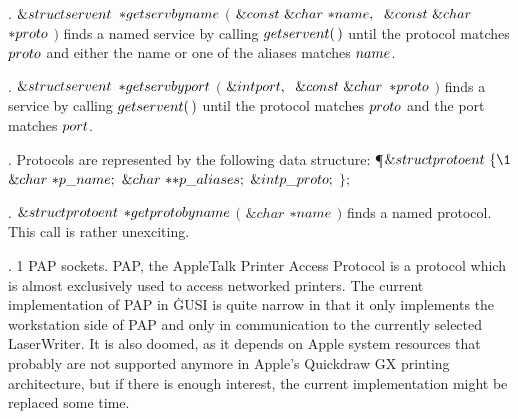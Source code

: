 \fi

. \CD{}$\&{struct}\ \\{servent}$ ${{*}}\\{getservbyname}$ $($ $\&{const}\ %
\&{char}\ {{*}}\\{name},\;\ \&{const}\ \&{char}$ ${{*}}\\{proto}$ $)$\DC{}
finds a named
service by calling \CD{}$\\{getservent}(\,)$\DC{} until the protocol matches %
\CD{}$\\{proto}$\DC{} and either the name or
one of the aliases matches \CD{}$\\{name}$\DC{}.

\fi

. \CD{}$\&{struct}\ \\{servent}$ ${{*}}\\{getservbyport}$ $($ $\&{int}\ %
\\{port},\;\ \&{const}\ \&{char}$ ${{*}}\\{proto}$ $)$\DC{} finds a
service by calling \CD{}$\\{getservent}(\,)$\DC{} until the protocol matches %
\CD{}$\\{proto}$\DC{} and the
port matches \CD{}$\\{port}$\DC{}.

\fi

. Protocols are represented by the following data structure:
\Y\P $\&{struct}\ \\{protoent}\ \{\1$\6
$\&{char}\ {{*}}\\{p\_name};$\5
\6
$\&{char}\ {{*}}{{*}}\\{p\_aliases};$\5
\6
$\&{int}\ \\{p\_proto};$\5
\2\6
$\};$\par
\fi

. \CD{}$\&{struct}\ \\{protoent}$ ${{*}}\\{getprotobyname}$ $($ $\&{char}$
${{*}}\\{name}$ $)$\DC{} finds a named protocol. This
call is rather unexciting.

\fi

. 1 PAP sockets. PAP, the AppleTalk Printer Access Protocol is a protocol
which is
almost exclusively used to access networked printers. The current
implementation of
PAP in \.{GUSI} is quite narrow in that it only implements the workstation side
of
PAP and only in communication to the currently selected LaserWriter. It is also
doomed, as it depends on Apple system resources that probably are not supported
anymore in Apple's Quickdraw GX printing architecture, but if there is enough
interest, the current implementation might be replaced some time.

